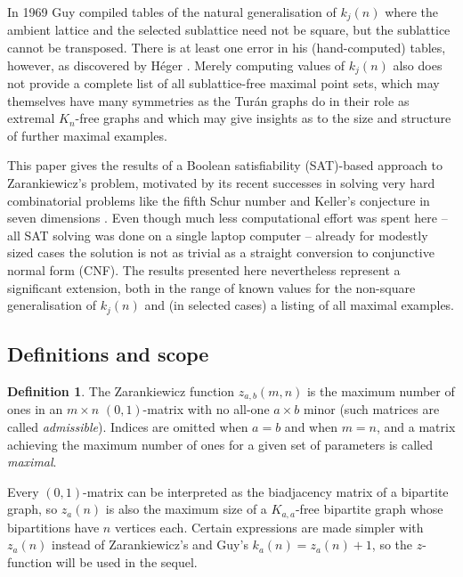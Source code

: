\documentclass[10pt,a4paper]{article}
\theoremstyle{definition}
\newtheorem{definition}{Definition}
\begin{document}
	In 1969 Guy \cite{guy} compiled tables of the natural generalisation of $k_j(n)$ where the ambient lattice and the selected sublattice need not be square, but the sublattice cannot be transposed. There is at least one error in his (hand-computed) tables, however, as discovered by Héger \cite{heger}. Merely computing values of $k_j(n)$ also does not provide a complete list of all sublattice-free maximal point sets, which may themselves have many symmetries as the Turán graphs do in their role as extremal $K_n$-free graphs and which may give insights as to the size and structure of further maximal examples.
	
	This paper gives the results of a Boolean satisfiability (SAT)-based approach to Zarankiewicz's problem, motivated by its recent successes in solving very hard combinatorial problems like the fifth Schur number \cite{schur5} and Keller's conjecture in seven dimensions \cite{keller}. Even though much less computational effort was spent here -- all SAT solving was done on a single laptop computer -- already for modestly sized cases the solution is not as trivial as a straight conversion to conjunctive normal form (CNF). The results presented here nevertheless represent a significant extension, both in the range of known values for the non-square generalisation of $k_j(n)$ and (in selected cases) a listing of all maximal examples.
	
	\subsection{Definitions and scope}
	
	\begin{definition}
		The Zarankiewicz function $z_{a,b}(m,n)$ is the maximum number of ones in an $m\times n$ $(0,1)$-matrix with no all-one $a\times b$ minor (such matrices are called \textit{admissible}). Indices are omitted when $a=b$ and when $m=n$, and a matrix achieving the maximum number of ones for a given set of parameters is called \textit{maximal}.
	\end{definition}
	
	Every $(0,1)$-matrix can be interpreted as the biadjacency matrix of a bipartite graph, so $z_a(n)$ is also the maximum size of a $K_{a,a}$-free bipartite graph whose bipartitions have $n$ vertices each. Certain expressions are made simpler with $z_a(n)$ instead of Zarankiewicz's \cite{origin} and Guy's \cite{guy} $k_a(n)=z_a(n)+1$, so the $z$-function will be used in the sequel.
	
\end{document}
